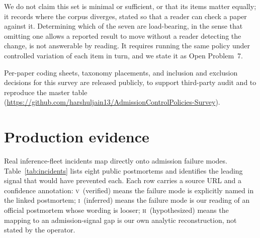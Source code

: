 \documentclass[10pt]{article} %
\theoremstyle{definition}
\newcommand{\artifacturl}{\url{https://github.com/harshuljain13/AdmissionControlPolicies-Survey}}
\newcommand{\artifacturl}{repository withheld for double-blind review;
    the coding sheets are included as supplementary material}
\begin{document}
We do not claim this set is minimal or sufficient, or that its items
matter equally; it records where the corpus diverges, stated so that a
reader can check a paper against it. Determining which of the seven are
load-bearing, in the sense that omitting one allows a reported result to
move without a reader detecting the change, is not answerable by
reading. It requires running the same policy under controlled variation
of each item in turn, and we state it as Open Problem~7.

Per-paper coding sheets, taxonomy placements, and inclusion and
exclusion decisions for this survey are released publicly, to support
third-party audit and to reproduce the master table
(\artifacturl).

\section{Production evidence}
\label{sec:prod}

Real inference-fleet incidents map directly onto admission failure
modes. Table~\ref{tab:incidents} lists eight public postmortems and
identifies the leading signal that would have prevented each. Each
row carries a source URL and a confidence annotation:
\textsc{v}~(verified) means the failure mode is explicitly named in
the linked postmortem; \textsc{i}~(inferred) means the failure mode
is our reading of an official postmortem whose wording is looser;
\textsc{h}~(hypothesized) means the mapping to an admission-signal
gap is our own analytic reconstruction, not stated by the operator.
\end{document}
